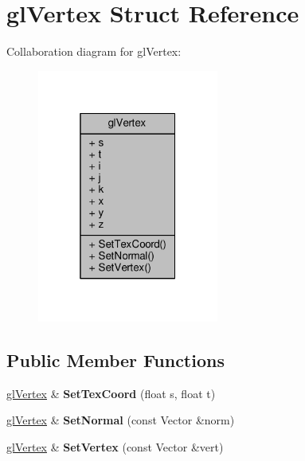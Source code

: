 \hypertarget{structglVertex}{}\section{gl\+Vertex Struct Reference}
\label{structglVertex}


Collaboration diagram for gl\+Vertex\+:
\nopagebreak
\begin{figure}[H]
\begin{center}
\leavevmode
\includegraphics[width=169pt]{dd/d5f/structglVertex__coll__graph}
\end{center}
\end{figure}
\subsection*{Public Member Functions}
\begin{DoxyCompactItemize}
\item 
\hyperlink{structglVertex}{gl\+Vertex} \& {\bfseries Set\+Tex\+Coord} (float s, float t)\hypertarget{structglVertex_a4c67bdfba6819ceaddfa3a8b6f84e7e5}{}\label{structglVertex_a4c67bdfba6819ceaddfa3a8b6f84e7e5}

\item 
\hyperlink{structglVertex}{gl\+Vertex} \& {\bfseries Set\+Normal} (const Vector \&norm)\hypertarget{structglVertex_a0b89a8bb2e1a30bc7baa308a8aa37569}{}\label{structglVertex_a0b89a8bb2e1a30bc7baa308a8aa37569}

\item 
\hyperlink{structglVertex}{gl\+Vertex} \& {\bfseries Set\+Vertex} (const Vector \&vert)\hypertarget{structglVertex_ad44cc307ec3506ac24d30bb320389a47}{}\label{structglVertex_ad44cc307ec3506ac24d30bb320389a47}

\end{DoxyCompactItemize}
